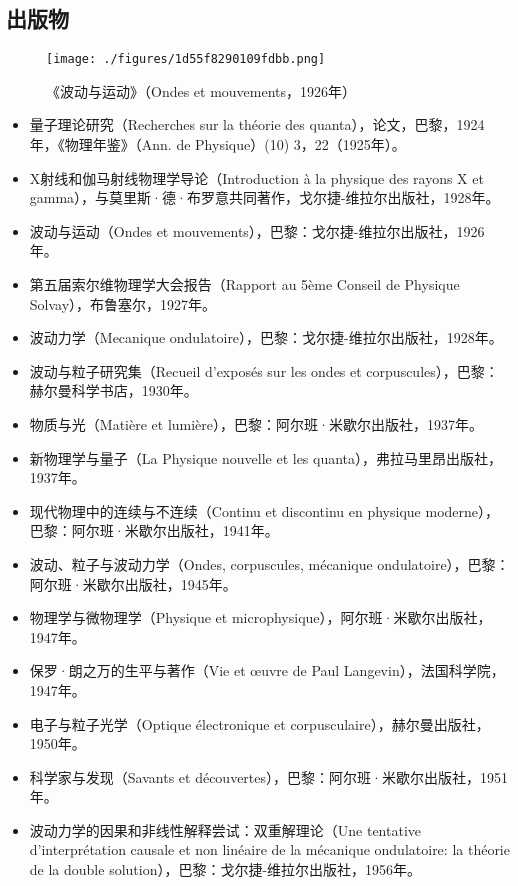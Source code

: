 \subsection{出版物}
\begin{figure}[ht]
\centering
\texttt{[image: ./figures/1d55f8290109fdbb.png]}
\caption{《波动与运动》（Ondes et mouvements，1926年）} \label{fig_Brogli_3}
\end{figure}
\begin{itemize}
\item 量子理论研究（Recherches sur la théorie des quanta），论文，巴黎，1924年，《物理年鉴》（Ann. de Physique）(10) 3，22（1925年）。  
\item X射线和伽马射线物理学导论（Introduction à la physique des rayons X et gamma），与莫里斯·德·布罗意共同著作，戈尔捷-维拉尔出版社，1928年。  
\item 波动与运动（Ondes et mouvements），巴黎：戈尔捷-维拉尔出版社，1926年。  
\item 第五届索尔维物理学大会报告（Rapport au 5ème Conseil de Physique Solvay），布鲁塞尔，1927年。  
\item 波动力学（Mecanique ondulatoire），巴黎：戈尔捷-维拉尔出版社，1928年。  
\item 波动与粒子研究集（Recueil d'exposés sur les ondes et corpuscules），巴黎：赫尔曼科学书店，1930年。  
\item 物质与光（Matière et lumière），巴黎：阿尔班·米歇尔出版社，1937年。  
\item 新物理学与量子（La Physique nouvelle et les quanta），弗拉马里昂出版社，1937年。  
\item 现代物理中的连续与不连续（Continu et discontinu en physique moderne），巴黎：阿尔班·米歇尔出版社，1941年。  
\item 波动、粒子与波动力学（Ondes, corpuscules, mécanique ondulatoire），巴黎：阿尔班·米歇尔出版社，1945年。  
\item 物理学与微物理学（Physique et microphysique），阿尔班·米歇尔出版社，1947年。  
\item 保罗·朗之万的生平与著作（Vie et œuvre de Paul Langevin），法国科学院，1947年。  
\item 电子与粒子光学（Optique électronique et corpusculaire），赫尔曼出版社，1950年。  
\item 科学家与发现（Savants et découvertes），巴黎：阿尔班·米歇尔出版社，1951年。  
\item 波动力学的因果和非线性解释尝试：双重解理论（Une tentative d'interprétation causale et non linéaire de la mécanique ondulatoire: la théorie de la double solution），巴黎：戈尔捷-维拉尔出版社，1956年。  

\end{itemize}
